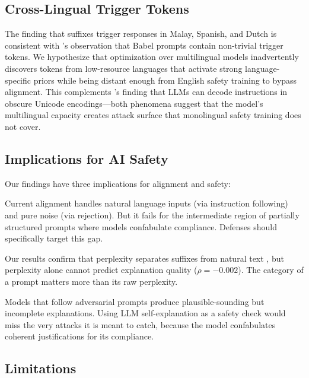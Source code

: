 \subsection{Cross-Lingual Trigger Tokens}

The finding that \gcg suffixes trigger responses in Malay, Spanish, and Dutch is consistent with \citet{cherepanova2024talking}'s observation that Babel prompts contain non-trivial trigger tokens. We hypothesize that \gcg optimization over multilingual models inadvertently discovers tokens from low-resource languages that activate strong language-specific priors while being distant enough from English safety training to bypass alignment. This complements \citet{erziev2025sens}'s finding that LLMs can decode instructions in obscure Unicode encodings---both phenomena suggest that the model's multilingual capacity creates attack surface that monolingual safety training does not cover.

\subsection{Implications for AI Safety}

Our findings have three implications for alignment and safety:

 Current alignment handles natural language inputs (via instruction following) and pure noise (via rejection). But it fails for the intermediate region of partially structured prompts where models confabulate compliance. Defenses should specifically target this gap.

 Our results confirm that perplexity separates \gcg suffixes from natural text \citep{alon2023detecting}, but perplexity alone cannot predict explanation quality ($\rho = -0.002$). The category of a prompt matters more than its raw perplexity.

 Models that follow adversarial prompts produce plausible-sounding but incomplete explanations. Using LLM self-explanation as a safety check would miss the very attacks it is meant to catch, because the model confabulates coherent justifications for its compliance.

\subsection{Limitations}

